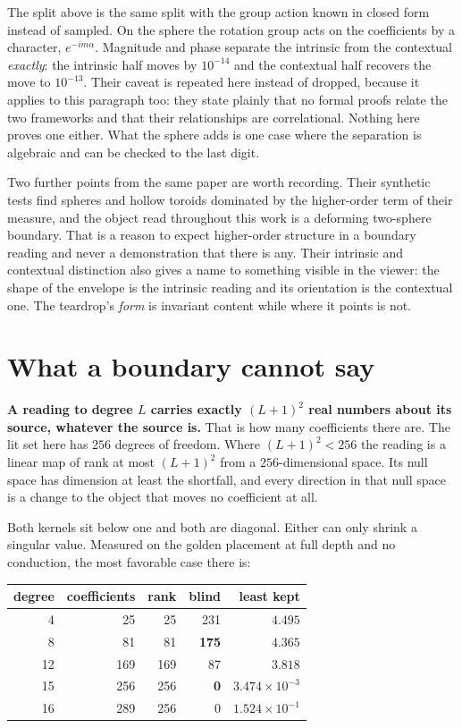 The split above is the same split with the group action known in closed form instead of sampled. On the sphere the rotation group acts on the coefficients by a character, \(e^{-im\alpha}\). Magnitude and phase separate the intrinsic from the contextual \emph{exactly}: the intrinsic half moves by \(10^{-14}\) and the contextual half recovers the move to \(10^{-13}\). Their caveat is repeated here instead of dropped, because it applies to this paragraph too: they state plainly that no formal proofs relate the two frameworks and that their relationships are correlational. Nothing here proves one either. What the sphere adds is one case where the separation is algebraic and can be checked to the last digit.

Two further points from the same paper are worth recording. Their synthetic tests find spheres and hollow toroids dominated by the higher-order term of their measure, and the object read throughout this work is a deforming two-sphere boundary. That is a reason to expect higher-order structure in a boundary reading and never a demonstration that there is any. Their intrinsic and contextual distinction also gives a name to something visible in the viewer: the shape of the envelope is the intrinsic reading and its orientation is the contextual one. The teardrop's \emph{form} is invariant content while where it points is not.

\section{What a boundary cannot say}
\label{sec:rank}

\textbf{A reading to degree \(L\) carries exactly \((L+1)^2\) real numbers about its source, whatever the source is.} That is how many coefficients there are. The lit set here has \(256\) degrees of freedom. Where \((L+1)^2 < 256\) the reading is a linear map of rank at most \((L+1)^2\) from a \(256\)-dimensional space. Its null space has dimension at least the shortfall, and every direction in that null space is a change to the object that moves no coefficient at all.

Both kernels sit below one and both are diagonal. Either can only shrink a singular value. Measured on the golden placement at full depth and no conduction, the most favorable case there is:

\begin{center}
\begin{tabular}{rrrrr}
\toprule
degree & coefficients & rank & blind & least kept \\
\midrule
4 & 25 & 25 & 231 & \(4.495\) \\
8 & 81 & 81 & \textbf{175} & \(4.365\) \\
12 & 169 & 169 & 87 & \(3.818\) \\
15 & 256 & 256 & \textbf{0} & \(3.474 \times 10^{-3}\) \\
16 & 289 & 256 & 0 & \(1.524 \times 10^{-1}\) \\
\bottomrule
\end{tabular}
\end{center}


